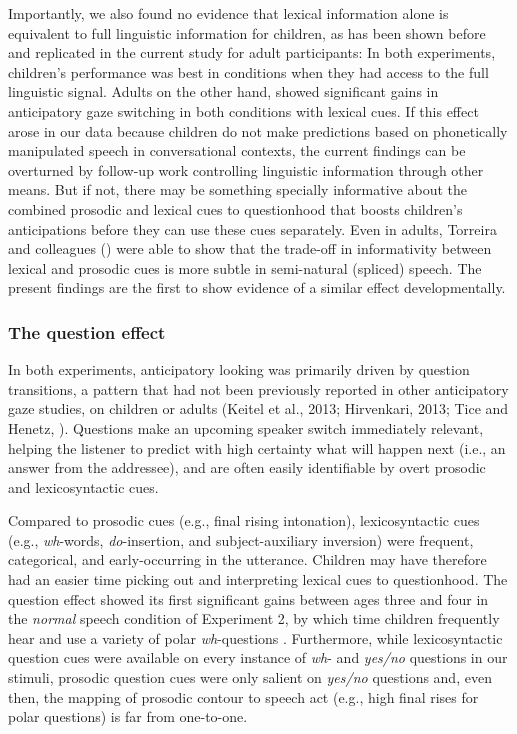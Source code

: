 \documentclass[authoryear, 12pt]{elsarticle}
\begin{document}
Importantly, we also found no evidence that lexical information alone is equivalent to full linguistic information for children, as has been shown before \citep{magyari2012, de-ruiter2006} and replicated in the current study for adult participants: In both experiments, children's performance was best in conditions when they had access to the full linguistic signal. Adults on the other hand, showed significant gains in anticipatory gaze switching in both conditions with lexical cues. If this effect arose in our data because children do not make predictions based on phonetically manipulated speech in conversational contexts, the current findings can be overturned by follow-up work controlling linguistic information through other means. But if not, there may be something specially informative about the combined prosodic and lexical cues to questionhood that boosts children's anticipations before they can use these cues separately. Even in adults, Torreira and colleagues (\citeyear{torreira2015}) were able to show that the trade-off in informativity between lexical and prosodic cues is more subtle in semi-natural (spliced) speech. The present findings are the first to show evidence of a similar effect developmentally.

\subsubsection{The question effect}

In both experiments, anticipatory looking was primarily driven by question transitions, a pattern that had not been previously reported in other anticipatory gaze studies, on children or adults (Keitel et al., 2013; Hirvenkari, 2013; Tice and Henetz, \citeyear{TiceHenetz11}). Questions make an upcoming speaker switch immediately relevant, helping the listener to predict with high certainty what will happen next (i.e., an answer from the addressee), and are often easily identifiable by overt prosodic and lexicosyntactic cues.

Compared to prosodic cues (e.g., final rising intonation), lexicosyntactic cues (e.g., \textit{wh}-words, \textit{do}-insertion, and subject-auxiliary inversion) were frequent, categorical, and early-occurring in the utterance. Children may have therefore had an easier time picking out and interpreting lexical cues to questionhood. The question effect showed its first significant gains between ages three and four in the \textit{normal} speech condition of Experiment 2, by which time children frequently hear and use a variety of polar \textit{wh}-questions \citep{clark2009}. Furthermore, while lexicosyntactic question cues were available on every instance of \textit{wh}- and \textit{yes/no} questions in our stimuli, prosodic question cues were only salient on \textit{yes/no} questions and, even then, the mapping of prosodic contour to speech act (e.g., high final rises for polar questions) is far from one-to-one.
\end{document}
